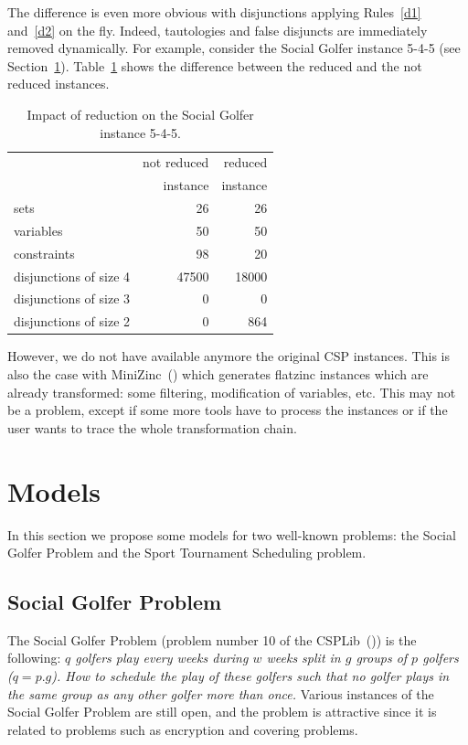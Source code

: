 \documentclass[3p,authoryear,times]{elsarticle}
\begin{document}
The difference is even more obvious with disjunctions applying Rules~\ref{d1} and~\ref{d2} on the fly. Indeed, tautologies and false disjuncts are immediately removed dynamically. For example, consider the Social Golfer instance 5-4-5 (see Section~\ref{sec:model}). Table~\ref{impact_reduction} shows the difference between the reduced and the not reduced instances. 
\begin{table}[ht]
\begin{center}
\begin{tabular}{|l|r|r|}
\hline
 & not reduced  & reduced \\
 & instance & instance \\ \hline
sets & 26 & 26\\
variables & 50 & 50 \\
constraints & 98 & 20 \\
disjunctions of size 4 & 47500 & 18000\\
disjunctions of size 3 & 0 & 0\\
disjunctions of size 2 & 0 & 864\\ \hline
\end{tabular}
\end{center}
\caption{Impact of reduction on the Social Golfer instance  5-4-5.} \label{impact_reduction}
\end{table}

However, we do not have available anymore the original CSP instances. This is also the case with MiniZinc~(\cite{minizinc}) which generates  flatzinc instances which are already transformed: some filtering, modification of variables, etc.
This may not be a problem, except if some more tools have to process the instances or if the user wants to trace the whole transformation chain.


\section{Models}
\label{sec:model}
In this section we propose some models for two well-known problems: the Social Golfer Problem and the Sport  Tournament Scheduling problem.

\subsection{Social Golfer Problem}

The Social Golfer Problem (problem number 10 of the CSPLib~(\cite{sgp})) is the following: \textit{$q$ golfers play every weeks during $w$ weeks split in $g$ groups of $p$ golfers ($q=p.g$). How to schedule the play of these golfers such that no golfer plays in the same group as any other golfer more than once.} 
Various instances of the Social Golfer Problem are still open, and the problem is attractive since it is  related to problems  such as encryption and covering problems.
\end{document}

